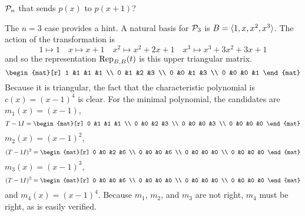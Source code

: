 \begin{exercises}
    \( \polyspace_n \) that sends \( p(x) \) to \( p(x+1) \)?
    \begin{answer}
      The $n=3$ case provides a hint.
      A natural basis for $\polyspace_3$ is  
      $B=\sequence{1,x,x^2,x^3}$.
      The action of the transformation is
      \begin{equation*}
        1\mapsto 1
        \quad
        x\mapsto x+1
        \quad
        x^2\mapsto x^2+2x+1
        \quad
        x^3\mapsto x^3+3x^2+3x+1
      \end{equation*}
      and so the representation $\rep{t}{B,B}$ is this upper triangular matrix.
      \begin{equation*}
        \begin{mat}[r]
          1  &1  &1  &1  \\
          0  &1  &2  &3  \\
          0  &0  &1  &3  \\
          0  &0  &0  &1
        \end{mat}
      \end{equation*}
      Because it is triangular, the fact that the characteristic polynomial is
      $c(x)=(x-1)^4$ is clear.
      For the minimal polynomial, the candidates are $m_1(x)=(x-1)$,
      \begin{equation*}
        T-1I=
        \begin{mat}[r]
          0  &1  &1  &1  \\
          0  &0  &2  &3  \\
          0  &0  &0  &3  \\
          0  &0  &0  &0
        \end{mat}
      \end{equation*}
      $m_2(x)=(x-1)^2$, 
      \begin{equation*}
        (T-1I)^2=
        \begin{mat}[r]
          0  &0  &2  &6  \\
          0  &0  &0  &6  \\
          0  &0  &0  &0  \\
          0  &0  &0  &0
        \end{mat}
      \end{equation*}
      $m_3(x)=(x-1)^3$,
      \begin{equation*}
        (T-1I)^3=
        \begin{mat}[r]
          0  &0  &0  &6  \\
          0  &0  &0  &0  \\
          0  &0  &0  &0  \\
          0  &0  &0  &0
        \end{mat}
      \end{equation*}
      and $m_4(x)=(x-1)^4$.
      Because $m_1$, $m_2$, and $m_3$ are not right, $m_4$ must be right,
      as is easily verified.
      

\end{answer}
\end{exercises}
